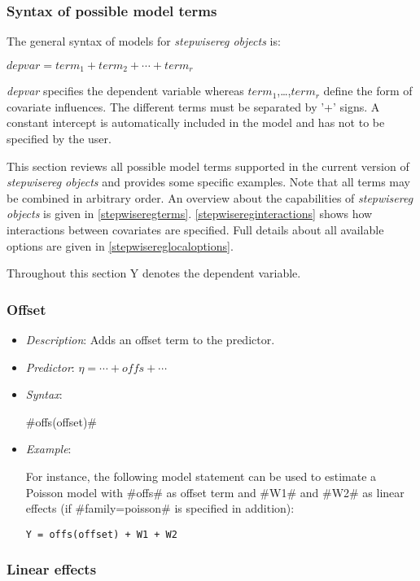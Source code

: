 \subsubsection{Syntax of possible model terms}
\label{stepwiseregmodelsyntax}

The general syntax of models for {\em stepwisereg objects} is:

$depvar = term_1 + term_2 + \cdots + term_r$

{\em depvar} specifies the dependent variable whereas
$term_1$,\dots,$term_r$ define the form of covariate influences. The
different terms must be separated by '+' signs. A constant intercept
is automatically included in the model and has not to be
specified by the user.

This section reviews all possible model terms supported in the
current version of {\em stepwisereg objects} and provides some specific
examples. Note that all terms may be combined in arbitrary
order. An overview about the capabilities of {\em stepwisereg objects}
is given in \autoref{stepwiseregterms}. \autoref{stepwisereginteractions}
shows how interactions between covariates are specified. Full
details about all available options are given in
\autoref{stepwisereglocaloptions}.

Throughout this section Y denotes the dependent variable.

\subsubsection*{Offset}

\begin{itemize}
\item[] {\em Description}: Adds an offset term to the predictor.
\item[] {\em Predictor}: $\eta =  \cdots + offs + \cdots$
\item[] {\em Syntax}:

#offs(offset)#
\item[] {\em Example}:

For instance, the following model statement can be used to estimate
a Poisson model with #offs# as offset term and #W1# and #W2# as
linear effects (if #family=poisson# is specified in addition):

\texttt{Y = offs(offset) + W1 + W2}
\end{itemize}

\subsubsection*{Linear effects}

